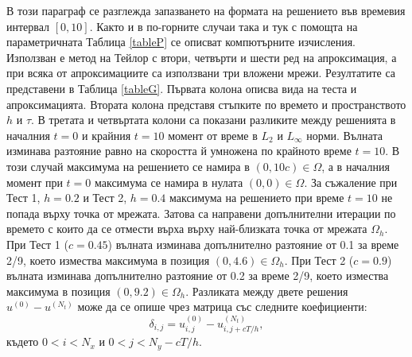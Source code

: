 \documentclass{article}
\begin{document}
В този параграф се разглежда запазването на формата на решението във времевия интервал $[0, 10]$. Както и в по-горните случаи така и тук с помощта на параметричната Таблица \ref{tableP} се описват компютърните изчисления. Използван е метод на Тейлор с втори, четвърти и шести ред на апроксимация, а при всяка от апроксимациите са използвани три вложени мрежи. Резултатите са представени в Таблица \ref{tableG}. Първата колона описва вида на теста и апроксимацията. Втората колона представя стъпките по времето и пространството $h$ и $\tau$. В третата и четвъртата колони са показани разликите между решенията в началния $t=0$ и крайния  $t=10$ момент от време в  $L_2$ и $L_\infty$ норми. Вълната изминава разтояние равно на скоростта й умножена по крайното време $t=10$. В този случай максимума на решението се намира в $(0, 10 c) \in \Omega$, а в началния момент при $t=0$ максимума се намира в нулата $(0, 0) \in \Omega$. За съжаление при Тест 1, $h=0.2$ и Тест 2, $h=0.4$ максимума на решението при време $t=10$ не попада върху точка от мрежата. Затова са направени допълнителни итерации по времето с които да се отмести върха върху най-близката точка от мрежата $\Omega_h$. При Тест 1 ($c=0.45$) вълната изминава допълнително разтояние от 0.1 за време 2/9, което измества максимума в позиция $(0, 4.6) \in \Omega_h$. При Тест 2 ($c=0.9$) вълната изминава допълнително разтояние от 0.2 за време 2/9, което измества максимума в позиция $(0, 9.2) \in \Omega_h$. Разликата между двете решения $u^{(0)} - u^{(N_t)}$ може да се опише чрез матрица със следните коефициенти:
$$ \delta_{i,j} = u_{i,j}^{(0)} - u_{i,j+cT/h}^{(N_t)},$$
където $0 < i < N_x$ и $0 < j < N_y - cT/h$. 
\end{document}
